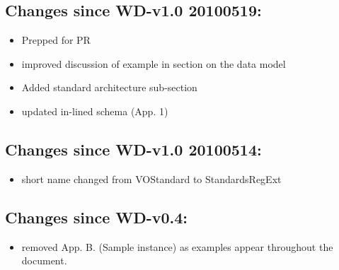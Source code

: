 \documentclass[11pt,a4paper]{ivoa}
\begin{document}
\subsection{Changes since WD-v1.0 20100519:}

\begin{itemize}

\item  Prepped for PR 

\item  improved discussion of example in section on the data model

\item  Added standard architecture sub-section

\item  updated in-lined schema (App. 1)

\end{itemize}

\subsection{Changes since WD-v1.0 20100514:}

\begin{itemize}

\item  short name changed from VOStandard to StandardsRegExt

\end{itemize}

\subsection{Changes since WD-v0.4:}

\begin{itemize}

\item  removed App. B. (Sample instance) as examples appear throughout
       the document.

\end{itemize}


\end{document}
